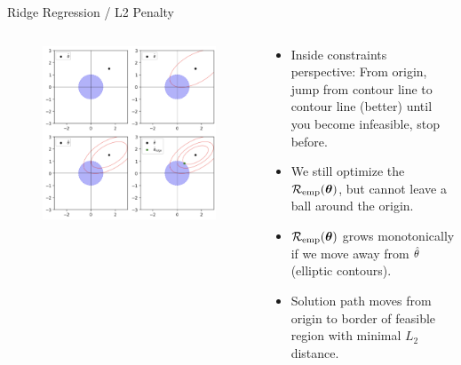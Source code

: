 \documentclass[11pt,compress,t,notes=noshow, xcolor=table]{beamer}
\begin{document}
\begin{vbframe}{Ridge Regression / L2 Penalty}
\framebreak

\begin{columns}
\begin{column}{0.5\textwidth}
\lz
\begin{figure}
\includegraphics[width=\textwidth]{figure/ridge_inside.png}
\end{figure}
\end{column}

\begin{column}{0.5\textwidth}
\begin{footnotesize} 
\begin{itemize}
  \item Inside constraints perspective: From origin, jump from contour line to contour line (better) until you become infeasible, stop before.
  \item We still optimize the $\mathcal{R}_{\text{emp}}(\bm{\theta})$, but cannot leave a ball around the origin.
  \item $\mathcal{R}_{\text{emp}}(\bm{\theta})$ grows monotonically if we move away from $\hat{\theta}$ (elliptic contours).
  \item Solution path moves from origin to border of feasible region with minimal $L_2$ distance.
\end{itemize}
\end{footnotesize}
\end{column}
\end{columns}



\end{vbframe}
\end{document}
